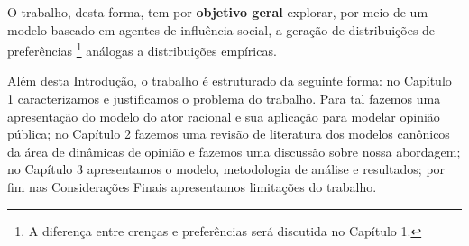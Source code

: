 O trabalho, desta forma, tem por \textbf{objetivo geral} explorar, por meio
de um modelo baseado em agentes de influência social, a geração de distribuições
de preferências \footnote{A diferença entre crenças e preferências será
discutida no Capítulo 1.} análogas a distribuições empíricas.

Além desta Introdução, o trabalho é estruturado da seguinte forma: no Capítulo 1
caracterizamos e justificamos o problema do trabalho. Para tal fazemos uma
apresentação do modelo do ator racional e sua aplicação para modelar opinião
pública; no Capítulo 2 fazemos uma revisão de literatura dos modelos canônicos
da área de dinâmicas de opinião e fazemos uma discussão sobre nossa abordagem;
no Capítulo 3 apresentamos o modelo, metodologia de análise e resultados;  por
fim nas Considerações Finais apresentamos limitações do trabalho.









